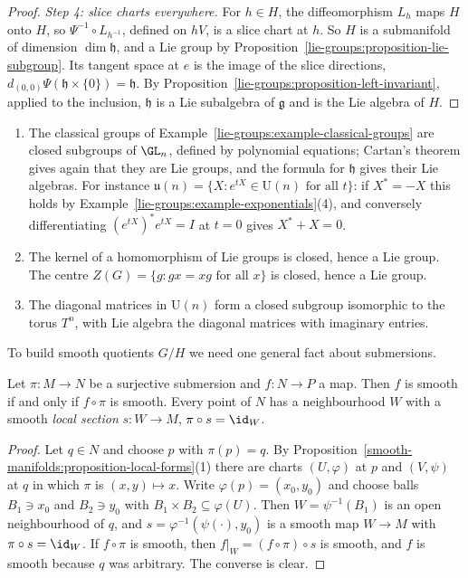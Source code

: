 \begin{proof}
\emph{Step 4: slice charts everywhere.} For $h \in H$, the diffeomorphism $L_h$ maps $H$ onto $H$, so $\Psi^{-1} \circ L_{h^{-1}}$, defined on $hV$, is a slice
chart at $h$. So $H$ is a submanifold of dimension $\dim\mathfrak{h}$, and a Lie group by Proposition~\ref{lie-groups:proposition-lie-subgroup}. Its tangent
space at $e$ is the image of the slice directions, $d_{(0,0)}\Psi(\mathfrak{h} \times \{0\}) = \mathfrak{h}$. By
Proposition~\ref{lie-groups:proposition-left-invariant}, applied to the inclusion, $\mathfrak{h}$ is a Lie subalgebra of $\mathfrak{g}$ and is the Lie algebra
of $H$.
\end{proof}

\begin{example}\label{lie-groups:example-closed-subgroups}
\begin{enumerate}
\item The classical groups of Example~\ref{lie-groups:example-classical-groups} are closed subgroups of $\GL_n$, defined by polynomial equations; Cartan's
theorem gives again that they are Lie groups, and the formula for $\mathfrak{h}$ gives their Lie algebras. For instance
$\mathfrak{u}(n) = \{X : e^{tX} \in \mathrm{U}(n) \text{ for all } t\}$: if $X^* = -X$ this holds by Example~\ref{lie-groups:example-exponentials}(4), and
conversely differentiating $(e^{tX})^*e^{tX} = I$ at $t = 0$ gives $X^* + X = 0$.
\item The kernel of a homomorphism of Lie groups is closed, hence a Lie group. The centre $Z(G) = \{g : gx = xg \text{ for all } x\}$ is closed, hence a
Lie group.
\item The diagonal matrices in $\mathrm{U}(n)$ form a closed subgroup isomorphic to the torus $T^n$, with Lie algebra the diagonal matrices with imaginary
entries.
\end{enumerate}
\end{example}

To build smooth quotients $G/H$ we need one general fact about submersions.

\begin{lemma}\label{lie-groups:lemma-submersion-descends}
Let $\pi \colon M \to N$ be a surjective submersion and $f \colon N \to P$ a map. Then $f$ is smooth if and only if $f \circ \pi$ is smooth. Every point of $N$
has a neighbourhood $W$ with a smooth \emph{local section} $s \colon W \to M$, $\pi \circ s = \id_W$.
\end{lemma}

\begin{proof}
Let $q \in N$ and choose $p$ with $\pi(p) = q$. By Proposition~\ref{smooth-manifolds:proposition-local-forms}(1) there are charts $(U, \varphi)$ at $p$ and
$(V, \psi)$ at $q$ in which $\pi$ is $(x, y) \mapsto x$. Write $\varphi(p) = (x_0, y_0)$ and choose balls $B_1 \ni x_0$ and $B_2 \ni y_0$ with
$B_1 \times B_2 \subseteq \varphi(U)$. Then $W = \psi^{-1}(B_1)$ is an open neighbourhood of $q$, and $s = \varphi^{-1}(\psi(\cdot), y_0)$ is a smooth map
$W \to M$ with $\pi \circ s = \id_W$. If $f \circ \pi$ is smooth, then $f|_W = (f \circ \pi) \circ s$ is smooth, and $f$ is smooth because $q$ was arbitrary. The
converse is clear.
\end{proof}

